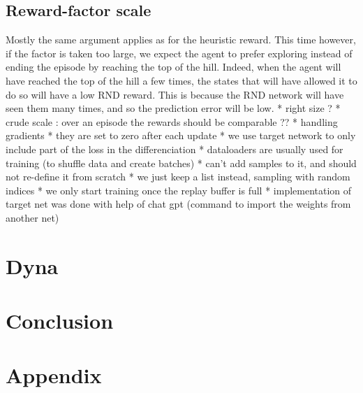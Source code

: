 \documentclass[a4paper, 12pt,oneside]{article}
\begin{document}
            \subsection{Reward-factor scale}
            Mostly the same argument applies as for the heuristic reward. This time however, if the factor is taken too large, we expect the agent to prefer exploring instead of ending the episode by reaching the top of the hill. Indeed, when the agent will have reached the top of the hill a few times, the states that will have allowed it to do so will have a low RND reward. This is because the RND network will have seen them many times, and so the prediction error will be low.
            * right size ?
            * crude scale : over an episode the rewards should be comparable ?? 
            * handling gradients 
            * they are set to zero after each update
            * we use target network to only include part of the loss in the differenciation 
          * dataloaders are usually used for training (to shuffle data and create batches)
            * can't add samples to it, and should not re-define it from scratch 
              * we just keep a list instead, sampling with random indices 
          * we only start training once the replay buffer is full 
          * implementation of target net was done with help of chat gpt (command to import the weights from another net)
        \section{Dyna}

        \section{Conclusion}

        \section{Appendix}
\end{document}
